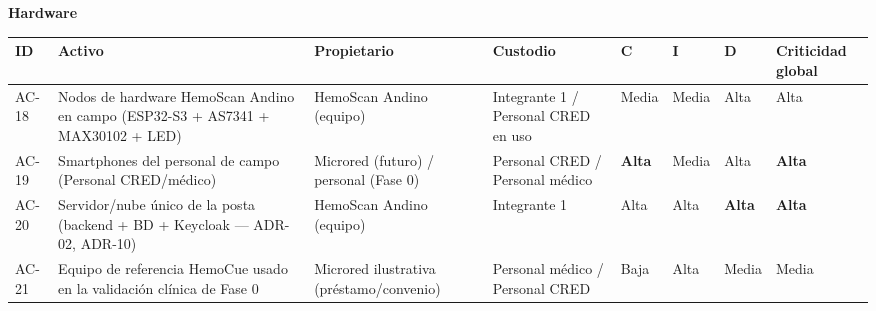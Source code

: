 \documentclass[11pt,a4paper]{article}
\begin{document}
\textbf{Hardware}

{\small
\begin{longtable}[]{@{}
  >{\raggedright\arraybackslash}p{}
  >{\raggedright\arraybackslash}p{}
  >{\raggedright\arraybackslash}p{}
  >{\raggedright\arraybackslash}p{}
  >{\raggedright\arraybackslash}p{}
  >{\raggedright\arraybackslash}p{}
  >{\raggedright\arraybackslash}p{}
  >{\raggedright\arraybackslash}p{}@{}}
\toprule\noalign{}
\begin{minipage}[b]{\linewidth}\raggedright
ID
\end{minipage} & \begin{minipage}[b]{\linewidth}\raggedright
Activo
\end{minipage} & \begin{minipage}[b]{\linewidth}\raggedright
Propietario
\end{minipage} & \begin{minipage}[b]{\linewidth}\raggedright
Custodio
\end{minipage} & \begin{minipage}[b]{\linewidth}\raggedright
C
\end{minipage} & \begin{minipage}[b]{\linewidth}\raggedright
I
\end{minipage} & \begin{minipage}[b]{\linewidth}\raggedright
D
\end{minipage} & \begin{minipage}[b]{\linewidth}\raggedright
Criticidad global
\end{minipage} \\
\midrule\noalign{}
\endhead
\bottomrule\noalign{}
\endlastfoot
AC-18 & Nodos de hardware HemoScan Andino en campo (ESP32-S3 + AS7341 + MAX30102 + LED) & HemoScan Andino (equipo) & Integrante 1 / Personal CRED en uso & Media & Media & Alta & Alta \\
AC-19 & Smartphones del personal de campo (Personal CRED/médico) & Microred (futuro) / personal (Fase 0) & Personal CRED / Personal médico & \textbf{Alta} & Media & Alta & \textbf{Alta} \\
AC-20 & Servidor/nube único de la posta (backend + BD + Keycloak --- ADR-02, ADR-10) & HemoScan Andino (equipo) & Integrante 1 & Alta & Alta & \textbf{Alta} & \textbf{Alta} \\
AC-21 & Equipo de referencia HemoCue usado en la validación clínica de Fase 0 & Microred ilustrativa (préstamo/convenio) & Personal médico / Personal CRED & Baja & Alta & Media & Media \\
\end{longtable}
}
\end{document}
